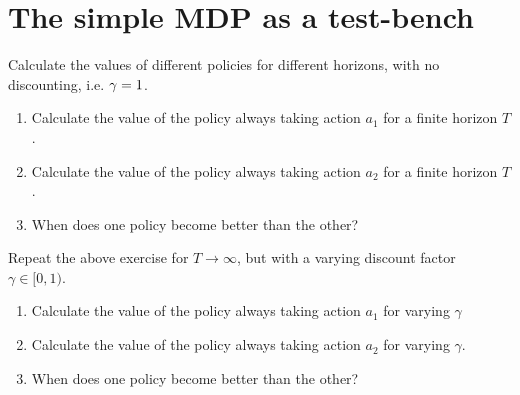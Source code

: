 \documentclass[twoside,a4paper]{article}
\begin{document}
\section{The simple MDP as a test-bench}
\label{sec:simple-mdp-as}
\begin{exercise}[30-60!]
  Calculate the values of different policies for different horizons, with no discounting, i.e. $\gamma = 1$.
  \begin{enumerate}
  \item Calculate the value of the policy always taking action $a_1$ for a finite horizon $T$. 
  \item Calculate the value of the policy always taking action $a_2$ for a finite horizon $T$. 
  \item When does one policy become better than the other?
  \end{enumerate}
  \label{exercise:simple-mdp-finite-horizon}
\end{exercise}


\begin{exercise}[30-60!]
  Repeat the above exercise for $T \to \infty$, but with a varying discount factor $\gamma \in [0,1)$. 
  \begin{enumerate}
  \item Calculate the value of the policy always taking action $a_1$ for varying $\gamma$
  \item Calculate the value of the policy always taking action $a_2$ for varying $\gamma$. 
  \item When does one policy become better than the other?
  \end{enumerate}
  \label{exercise:simple-mdp-discounted}
\end{exercise}
\end{document}
